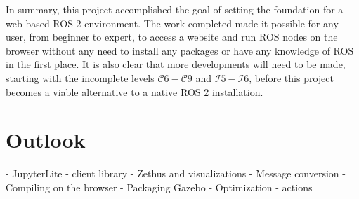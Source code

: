 In summary, this project accomplished the goal of setting the foundation for a web-based \ac{ROS} 2 environment. The work completed made it possible for any user, from beginner to expert, to access a website and run \ac{ROS} nodes on the browser without any need to install any packages or have any knowledge of \ac{ROS} in the first place. It is also clear that more developments will need to be made, starting with the incomplete levels $\mathcal{C}6-\mathcal{C}9$ and $\mathcal{I}5-\mathcal{I}6$, before this project becomes a viable alternative to a native \ac{ROS} 2 installation.


\section{Outlook}

- JupyterLite
- client library
- Zethus and visualizations
- Message conversion
- Compiling on the browser
- Packaging Gazebo
- Optimization
- actions